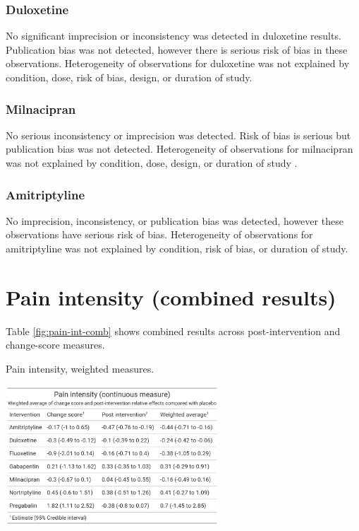 \documentclass{report}\usepackage[]{graphicx}\usepackage[]{color}
\begin{document}
\subsubsection{Duloxetine}

No significant imprecision or inconsistency was detected in duloxetine results. Publication bias was not detected, however there is serious risk of bias in these observations. Heterogeneity of observations for duloxetine was not explained by condition, dose, risk of bias, design, or duration of study.

\subsubsection{Milnacipran}

No serious inconsistency or imprecision was detected. Risk of bias is serious but publication bias was not detected. Heterogeneity of observations for milnacipran was not explained by condition, dose, design, or duration of study .

\subsubsection{Amitriptyline}

No imprecision, inconsistency, or publication bias was detected, however these observations have serious risk of bias. Heterogeneity of observations for amitriptyline was not explained by condition, risk of bias, or duration of study.

\section{Pain intensity (combined results)}

Table \ref{fig:pain-int-comb} shows combined results across post-intervention and change-score measures.

\begin{table}
\centering
\caption{Pain intensity, weighted measures.}
\label{fig:pain-int-comb}
\includegraphics[width=0.6\textwidth]{img/pain_int-combined.png}
\end{table}
\end{document}
